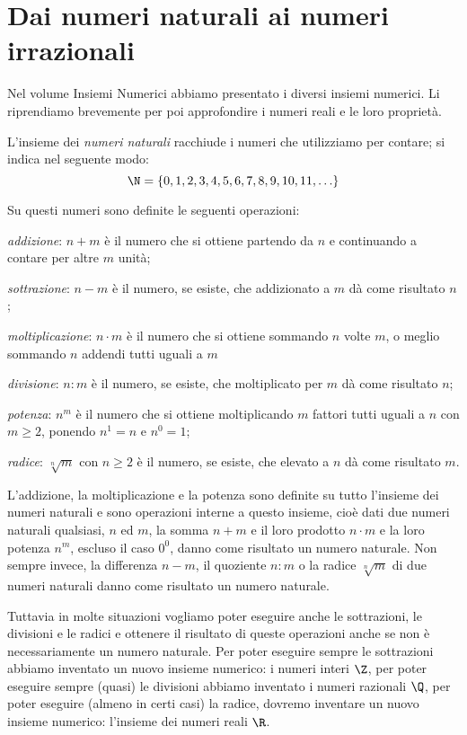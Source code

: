
\section{Dai numeri naturali ai numeri irrazionali}
\label{sec:radicali_irrazionali}
Nel volume Insiemi Numerici abbiamo presentato i diversi insiemi numerici. 
Li riprendiamo brevemente per poi approfondire i numeri reali e le loro 
proprietà.

L'insieme dei \emph{numeri naturali} racchiude i numeri che utilizziamo 
per contare; si indica nel seguente modo:
\[\N=\{0,1,2,3,4,5,6,7,8,9,10,11,\ldots\}\]

Su questi numeri sono definite le seguenti operazioni:
\begin{itemize*}
\item \emph{addizione}: \(n+m\) è il numero che si ottiene partendo da 
\(n\) e continuando a contare per altre \(m\) unità;
\item \emph{sottrazione}: \(n-m\) è il numero, se esiste, che 
addizionato a \(m\) dà come risultato \(n\);
\item \emph{moltiplicazione}: \(n \cdot m\) è il numero che si ottiene 
sommando 
\(n\) volte \(m\), o meglio sommando \(n\) addendi tutti uguali a \(m\)
\item \emph{divisione}: \(n:m\) è il numero, se esiste, che 
moltiplicato per \(m\) dà come risultato \(n\);
\item \emph{potenza}: \(n^{m}\) è il numero che si ottiene moltiplicando 
\(m\) 
fattori tutti uguali a \(n\) con \(m \ge 2\), ponendo \(n^{1}=n\) e 
\(n^{0}=1\);
\item \emph{radice}: \(\sqrt[{n}]{m}\) con \(n\ge 2\) è il numero, se 
esiste, 
che elevato a \(n\) dà come risultato \(m\).
\end{itemize*}

L'addizione, la moltiplicazione e la potenza sono definite su tutto 
l'insieme dei numeri naturali e sono operazioni interne a questo insieme,
cioè dati due numeri naturali qualsiasi, \(n\) 
ed \(m\), la somma \(n+m\) e il loro prodotto \(n \cdot m\) e la loro 
potenza \(n^{m}\), escluso il caso \(0^{0}\), danno come risultato un 
numero naturale. 
Non sempre invece, la differenza \(n-m\), il quoziente \(n:m\) o la 
radice \(\sqrt[{n}]{m}\) di due numeri naturali danno come risultato un 
numero naturale.

Tuttavia in molte situazioni vogliamo poter eseguire anche le sottrazioni, 
le divisioni e le radici e ottenere il risultato di queste operazioni 
anche se non è necessariamente un numero naturale. Per poter eseguire 
sempre le sottrazioni abbiamo inventato un nuovo insieme numerico: i 
numeri interi \(\Z\), per poter eseguire sempre (quasi) le divisioni 
abbiamo inventato i numeri razionali \(\Q\), per poter eseguire (almeno 
in certi casi) la radice, dovremo inventare un nuovo insieme numerico: 
l'insieme dei numeri reali \(\R\).

